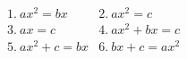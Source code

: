 \documentclass[preview]{standalone}
\begin{document}
\begin{align*}
&1.\ ax^2 = bx    &2.\ ax^2 = c \\ &3.\ ax = c    &4.\ ax^2+bx = c \\ &5.\ ax^2+c = bx  &6.\ bx+c = ax^2
\end{align*}
\end{document}
